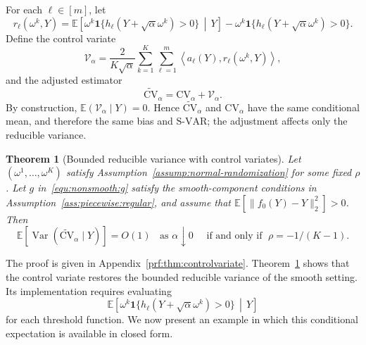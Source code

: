 \documentclass[12pt]{article}
\newtheorem{theorem}{Theorem}[section]
\DeclareMathOperator{\Var}{Var}
\theoremstyle{general}
\newcommand{\cv}{{\mathrm{CV}}}
\begin{document}
For each $\ell\in[m]$, let
\[ 
r_\ell(\omega^k,Y) = \mathbb{E}\!\left[ \omega^k \mathbf{1} \bigl\{ h_\ell(Y+\sqrt{\alpha}\omega^k)>0 \bigr\} \,\middle|\, Y \right] - \omega^k \mathbf{1} \bigl\{ h_\ell(Y+\sqrt{\alpha}\omega^k)>0 \bigr\}.
\] 
Define the control variate
\begin{equation} \label{eqn: controlvariate} 
    \mathcal{V}_{\alpha} = \frac{2}{K\sqrt{\alpha}} \sum_{k=1}^K \sum_{\ell=1}^m \left\langle a_\ell(Y), r_\ell(\omega^k,Y) \right\rangle ,
\end{equation} 
and the adjusted estimator
\begin{equation*} 
    \widetilde{\cv}_{\alpha} = \cv_{\alpha} + \mathcal{V}_{\alpha}. 
\end{equation*} 
By construction, \(\mathbb E(\mathcal V_\alpha\mid Y)=0\). Hence
\(\widetilde{\cv}_\alpha\) and \(\cv_\alpha\) have the same conditional mean, and therefore the same bias and \(\mathrm{S\text{-}VAR}\); the adjustment affects only the reducible variance.

\begin{theorem}[Bounded reducible variance with control variates] 
\label{thm:controlvariate} 
Let $(\omega^1,\ldots,\omega^K)$ satisfy Assumption~\ref{assump:normal-randomization} for some fixed $\rho$. Let $g$ in~\eqref{equ:nonsmooth:g} satisfy the smooth-component conditions in Assumption~\ref{ass:piecewise:regular}, and assume that $ \mathbb{E}\left[ \|f_0(Y)-Y\|_2^2 \right] >0$. Then 
\[
\mathbb{E}\left[\Var\!\left(\widetilde{\cv}_{\alpha} \mid Y\right)\right] =O(1) \;\; \text{ as } \alpha \downarrow 0 \quad \text{ if and only if }\; \rho=-1/(K-1).
\]
\end{theorem}

The proof is given in Appendix~\ref{prf:thm:controlvariate}. Theorem~\ref{thm:controlvariate} shows that the control variate restores the bounded reducible variance of the smooth setting. Its implementation requires evaluating \[ \mathbb{E}\!\left[ \omega^k \mathbf{1} \bigl\{ h_\ell(Y+\sqrt{\alpha}\omega^k)>0 \bigr\} \,\middle|\, Y \right] \] for each threshold function. We now present an example in which this conditional expectation is available in closed form.
\end{document}
